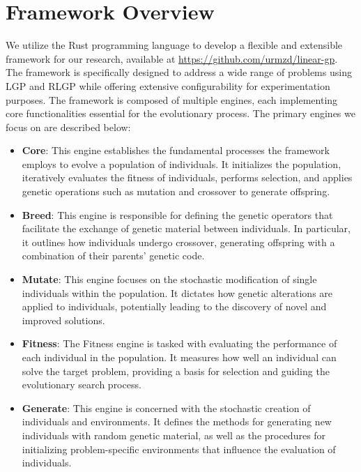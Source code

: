 \documentclass[12pt]{report}
\begin{document}
\section{Framework Overview}
We utilize the Rust programming language to develop a flexible and extensible framework for our research, available at \url{https://github.com/urmzd/linear-gp}. The framework is specifically designed to address a wide range of problems using LGP and RLGP while offering extensive configurability for experimentation purposes. The framework is composed of multiple engines, each implementing core functionalities essential for the evolutionary process. The primary engines we focus on are described below:

\begin{itemize}
	\item \textbf{Core}: This engine establishes the fundamental processes the framework employs to evolve a population of individuals. It initializes the population, iteratively evaluates the fitness of individuals, performs selection, and applies genetic operations such as mutation and crossover to generate offspring.

	\item \textbf{Breed}: This engine is responsible for defining the genetic operators that facilitate the exchange of genetic material between individuals. In particular, it outlines how individuals undergo crossover, generating offspring with a combination of their parents' genetic code.

	\item \textbf{Mutate}: This engine focuses on the stochastic modification of single individuals within the population. It dictates how genetic alterations are applied to individuals, potentially leading to the discovery of novel and improved solutions.

	\item \textbf{Fitness}: The Fitness engine is tasked with evaluating the performance of each individual in the population. It measures how well an individual can solve the target problem, providing a basis for selection and guiding the evolutionary search process.

	\item \textbf{Generate}: This engine is concerned with the stochastic creation of individuals and environments. It defines the methods for generating new individuals with random genetic material, as well as the procedures for initializing problem-specific environments that influence the evaluation of individuals.
\end{itemize}
\end{document}
